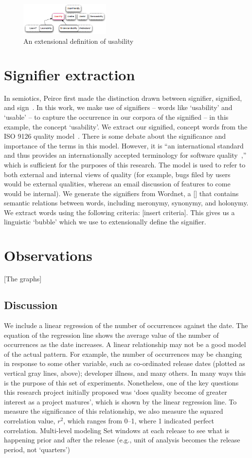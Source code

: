 \documentclass[conference, compsoc]{IEEEtran}
\begin{document}
\begin{figure}[b]
\centering
\includegraphics[width=0.4\textwidth]{synonym-graph.png}
\caption{An extensional definition of usability}
\label{fig:syngraph}
\end{figure}
	
	
\section{Signifier extraction} %
In semiotics, Peirce first made the distinction drawn between signifier, signified, and sign~\cite{atkin2006}. In this work, we make use of signifiers -- words like `usability' and `usable' -- to capture the occurrence in our corpora of the signified -- in this example, the concept `usability'. We extract our signified, concept words from the ISO 9126 quality model~\cite{iso9126}. There is some debate about the significance and importance of the terms in this model. However, it is ``an international standard and thus provides an internationally accepted terminology for software quality~\cite[p. 58]{Boegh2008},'' which is sufficient for the purposes of this research. The model is used to refer to both external and internal views of quality (for example, bugs filed by users would be external qualities, whereas an email discussion of features to come would be internal). We generate the signifiers from Wordnet, a [] that contains semantic relations between words, including meronymy, synonymy, and holonymy. We extract words using the following criteria: [insert criteria]. This gives us a linguistic `bubble' which we use to extensionally define the signifier.

\section{Observations}
[The graphs]
\subsection{Discussion}
We include a linear regression of the number of occurrences against the date. The equation of the regression line shows the average value of the number of occurrences as the date increases. A linear relationship may not be a good model of the actual pattern. For example, the number of occurrences may be changing in response to some other variable, such as co-ordinated release dates (plotted as vertical gray lines, above); developer illness, and many others. In many ways this is the purpose of this set of experiments. Nonetheless, one of the key questions this research project initially proposed was `does quality become of greater interest as a project matures', which is shown by the linear regression line. To measure the significance of this relationship, we also measure the squared correlation value, $r^2$, which ranges from 0--1, where 1 indicated perfect correlation.
Multi-level modeling
Set windows at each release to see what is happening prior and after the release (e.g., unit of analysis becomes the release period, not `quarters')
\end{document}
